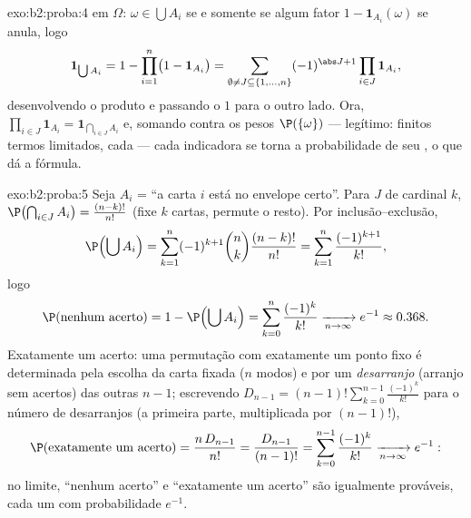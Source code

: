 \begin{solution}{exo:b2:proba:4}
 em $\Omega$: $\omega \in \bigcup A_i$ se e somente se algum fator
$1 - \mathbf{1}_{A_i}(\omega)$ se anula, logo
\[
\mathbf{1}_{\bigcup A_i}
= 1 - \prod_{i=1}^n\bigl(1 - \mathbf{1}_{A_i}\bigr)
= \sum_{\emptyset \neq J \subseteq \{1,\dots,n\}}
(-1)^{\abs J + 1}\prod_{i \in J}\mathbf{1}_{A_i} ,
\]
desenvolvendo o produto e passando o $1$ para o outro lado. Ora,
$\prod_{i\in J}\mathbf{1}_{A_i} = \mathbf{1}_{\bigcap_{i \in J}
A_i}$ e, somando contra os pesos $\P(\{\omega\})$ ---
legítimo: finitos termos limitados, cada  ---
cada indicadora se torna a probabilidade de seu , o que dá
a fórmula.
\end{solution}

\begin{solution}{exo:b2:proba:5}
Seja $A_i$ = ``a carta $i$ está no envelope certo''. Para $J$ de
cardinal $k$, $\P\bigl(\bigcap_{i\in J}A_i\bigr) =
\frac{(n-k)!}{n!}$ (fixe $k$ cartas, permute o resto). Por
inclusão--exclusão,
\[
\P\Bigl(\bigcup A_i\Bigr)
= \sum_{k=1}^n (-1)^{k+1}\binom nk \frac{(n-k)!}{n!}
= \sum_{k=1}^n \frac{(-1)^{k+1}}{k!} ,
\]
logo
\[
\P(\text{nenhum acerto})
= 1 - \P\Bigl(\bigcup A_i\Bigr)
= \sum_{k=0}^{n}\frac{(-1)^k}{k!}
\xrightarrow[n\to\infty]{} e^{-1} \approx 0.368 .
\]
Exatamente um acerto: uma permutação com exatamente um ponto fixo é
determinada pela escolha da carta fixada ($n$ modos) e por um
\emph{desarranjo} (arranjo sem acertos) das outras $n - 1$;
escrevendo $D_{n-1} = (n-1)!\sum_{k=0}^{n-1}\frac{(-1)^k}{k!}$ para
o número de desarranjos (a primeira parte, multiplicada por
$(n-1)!$),
\[
\P(\text{exatamente um acerto})
= \frac{n\,D_{n-1}}{n!}
= \frac{D_{n-1}}{(n-1)!}
= \sum_{k=0}^{n-1}\frac{(-1)^k}{k!}
\xrightarrow[n\to\infty]{} e^{-1} :
\]
no limite, ``nenhum acerto'' e ``exatamente um acerto'' são igualmente
prováveis, cada um com probabilidade $e^{-1}$.
\end{solution}

